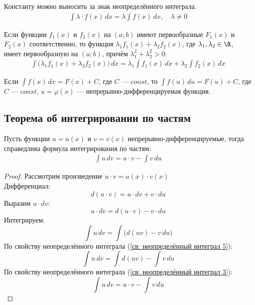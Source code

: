 \begin{property}
    Константу можно выносить за знак неопределённого интеграла.
    \begin{gather*}
        \boxed{\int \lambda\cdot f(x)\, dx = \lambda \int f(x)\, dx},\quad \lambda \ne 0
    \end{gather*}
\end{property}

\begin{property}
    Если функции $f_1(x)$ и $f_2(x)$ на $(a;b)$ имеют первообразные $F_1(x)$ и $F_2(x)$ соответственно, то функция $\lambda_1 f_1(x) + \lambda_2 f_2(x)$, где $\lambda_1, \lambda_2 \in \R$, имеет первообразную на $(a;b)$, причём $\lambda_1^2 + \lambda_2^2 > 0\colon$
    \begin{gather*}
        \int\Big(\lambda_1 f_1(x) + \lambda_2 f_2(x)\Big)\, dx = \lambda_1 \int f_1(x)\, dx + \lambda_2 \int f_2(x)\, dx
    \end{gather*}
\end{property}

\begin{property}
    Если $\int f(x)\, dx = F(x) + C$, где $C$ --- $const$, то $\int f(u)\, du = F(u) + C$, где $C$ --- $const$, ${u = \varphi (x)}$ --- непрерывно-дифференцируемая функция.
\end{property}

\newpage
\subsection*{Теорема об интегрировании по частям}
\begin{theorem}
    Пусть функции $u = u(x)$ и $v = v(x)$ непрерывно-дифференцируемые, тогда справедлива формула интегрирования по частям:
    \begin{gather*}
        \boxed{\int u\, dv = u\cdot v - \int v\, du}
    \end{gather*}
\end{theorem}
\begin{proof}
    Рассмотрим произведение $u\cdot v = u(x)\cdot v(x)$\\
    Дифференциал:
    \[
        d(u\cdot v) = u\cdot dv + v\cdot du
    \]
    Выразим $u\cdot dv$:
    \[
        u\cdot dv = d(u\cdot v) - v\cdot du
    \]
    Интегрируем:
    \[
        \int u\, dv = \int \Big(d(uv) - v\, du\Big)
    \]
    По свойству неопределённого интеграла (\ref{св: неопределённый интеграл 5}):
    \[
        \int u\, dv = \int d(uv) - \int v\, du
    \]
    По свойству неопределённого интеграла (\ref{св: неопределённый интеграл 3}):
    \[
        \int u\, dv = u\cdot v - \int v\, du
    \]
\end{proof}

